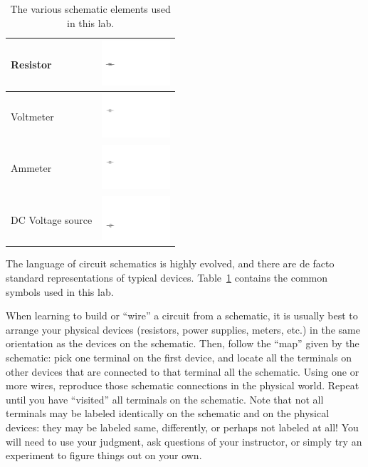 \documentclass[12pt]{article}
\begin{document}
\begin{table}
  \centering
  \begin{tabular}{|l|c|}\hline
    Resistor & \includegraphics[width=1in]{figures/resistor}\\ \hline
    Voltmeter & \includegraphics[width=1in]{figures/voltmeter}\\ \hline
    Ammeter & \includegraphics[width=1in]{figures/ammeter} \\ \hline
    DC Voltage source & \includegraphics[width=1in]{figures/dc_supply}\\ \hline
  \end{tabular}
  \caption{The various schematic elements used in this lab.}
  \label{tab:schematic}
\end{table}
The language of circuit schematics is highly evolved, and there are de
facto standard representations of typical devices.
Table~\ref{tab:schematic} contains the common symbols used in this
lab.  

When learning to build or ``wire'' a circuit from a schematic, it is
usually best to arrange your physical devices (resistors, power
supplies, meters, etc.) in the same orientation as the devices on the
schematic.  Then, follow the ``map'' given by the schematic: pick one
terminal on the first device, and locate all the terminals on other
devices that are connected to that terminal all the schematic.  Using
one or more wires, reproduce those schematic connections in the
physical world.  Repeat until you have ``visited'' all terminals on
the schematic.  Note that not all terminals may be labeled identically
on the schematic and on the physical devices: they may be labeled
same, differently, or perhaps not labeled at all!  You will need to
use your judgment, ask questions of your instructor, or simply try
an experiment to figure things out on your own.
\end{document}
